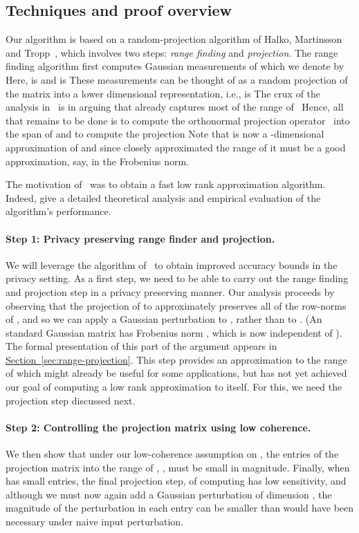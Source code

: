 \documentclass[letterpaper,11pt]{article}
\theoremstyle{definition}
\newcommand{\sectionref}[1]{\hyperref[sec:#1]{Section~\ref{sec:#1}}}
\begin{document}
\subsection{Techniques and proof overview}
Our algorithm is based on a random-projection algorithm of Halko, Martinsson
and Tropp~\cite{HalkoMT11},
which involves two steps: \emph{range finding} and \emph{projection}. The
range finding algorithm first computes  Gaussian measurements of  which
we denote by  Here,  is  and  is  These measurements can be thought of as a random projection of the matrix
into a lower dimensional representation, i.e.,  is  The crux of
the analysis in~\cite{HalkoMT11} is in arguing that  already captures most
of the range of~ Hence, all that remains to be done is to compute the
orthonormal projection operator~ into the span of  and to compute the
projection  Note that  is now a -dimensional approximation of
 and since  closely approximated the range of  it must be a good
approximation, say, in the Frobenius norm.

The motivation of~\cite{HalkoMT11} was to obtain a fast low rank approximation
algorithm. Indeed, \cite{HalkoMT11} give a detailed theoretical analysis and
empirical evaluation of the algorithm's performance.

\paragraph{Step 1: Privacy preserving range finder and projection.}
We will leverage the algorithm of~\cite{HalkoMT11} to obtain improved accuracy
bounds in the privacy setting. As a first step, we need to be able to carry out
the range finding and projection step in a privacy preserving manner.
Our analysis proceeds by observing that the projection of
 to  approximately preserves all of the  row-norms of , and
so we can apply a Gaussian perturbation to , rather than to . (An
 standard Gaussian matrix has Frobenius norm ,
which is now independent of ). The formal presentation of this part of the
argument appears in \sectionref{range-projection}. This step provides an
approximation to the range of  which might already be useful for some applications,
but has not yet achieved our goal of computing a low rank approximation to 
itself. For this, we need the projection step discussed next.

\paragraph{Step 2: Controlling the projection matrix using low coherence.}
We then show that under our low-coherence
assumption on , the entries of the projection matrix into the range of ,
, must be small in magnitude.
Finally, when  has small entries, the final
projection step, of computing  has low sensitivity, and although we must
now again add a Gaussian perturbation of dimension , the magnitude
of the perturbation in each entry can be smaller than would have been
necessary under naive input perturbation.
\end{document}
